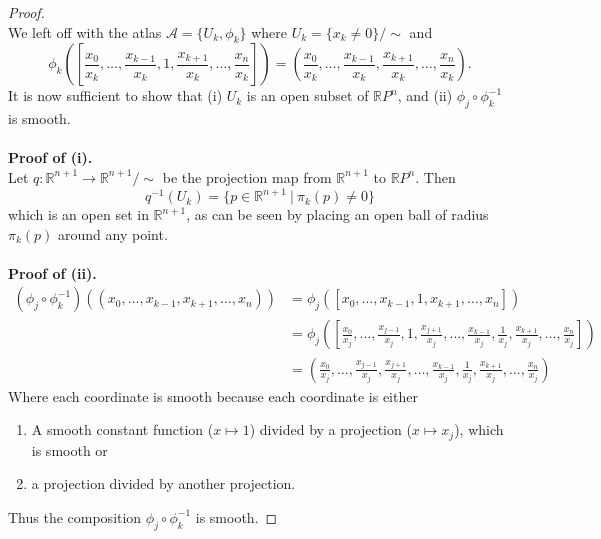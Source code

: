 \documentclass{article}
\begin{document}
\begin{proof} \text{} \\
  We left off with the atlas $\mathcal{A} = \{U_k, \phi_k\}$
  where $U_k = \{x_k \not= 0\}/\sim$ and \[
    \phi_k\left(\left[
      \frac{x_0}{x_k}, \hdots,
      \frac{x_{k - 1}}{x_k}, 1, \frac{x_{k + 1}}{x_k}, \hdots,
      \frac{x_n}{x_k}
    \right]\right) = \left(
      \frac{x_0}{x_k}, \hdots,
      \frac{x_{k - 1}}{x_k}, \frac{x_{k + 1}}{x_k}, \hdots,
      \frac{x_n}{x_k}
    \right).
  \]
  It is now sufficient to show that (i) $U_k$ is an open subset of $\mathbb{R}P^n$,
  and (ii) $\phi_j \circ \phi_k^{-1}$ is smooth.\\
  \\
  \textbf{Proof of (i).}\\
  Let $q : \mathbb{R}^{n + 1} \rightarrow \mathbb{R}^{n + 1}/\sim$ be the
  projection map from $\mathbb{R}^{n + 1}$ to $\mathbb{R}P^n$. Then \[
    q^{-1}(U_k) = \{p \in \mathbb{R}^{n + 1}\ |\ \pi_k(p) \not= 0\}
  \] which is an open set in $\mathbb{R}^{n + 1}$, as can be seen by placing an
  open ball of radius $\pi_k(p)$ around any point.\\
  \\
  \textbf{Proof of (ii).}\begin{align*}
    (\phi_j \circ \phi_k^{-1})((x_0, \hdots, x_{k - 1}, x_{k + 1}, \hdots, x_n))
    &= \phi_j([x_0, \hdots, x_{k - 1}, 1, x_{k + 1}, \hdots, x_n]) \\
    &= \phi_j\left(\left[
      \frac{x_0}{x_j}, \hdots,
      \frac{x_{j - 1}}{x_j}, 1, \frac{x_{j + 1}}{x_j}, \hdots,
      \frac{x_{k - 1}}{x_j}, \frac{1}{x_j}, \frac{x_{k + 1}}{x_j}, \hdots,
      \frac{x_n}{x_j}
    \right]\right) \\
    &= \left(
      \frac{x_0}{x_j}, \hdots,
      \frac{x_{j - 1}}{x_j}, \frac{x_{j + 1}}{x_j}, \hdots,
      \frac{x_{k - 1}}{x_j}, \frac{1}{x_j}, \frac{x_{k + 1}}{x_j}, \hdots,
      \frac{x_n}{x_j}
    \right)
  \end{align*}
  Where each coordinate is smooth because each coordinate is either \begin{enumerate}
    \item A smooth constant function ($x \mapsto 1$) divided by a projection
    ($x \mapsto x_j$), which is smooth or
    \item a projection divided by another projection.
  \end{enumerate}
  Thus the composition $\phi_j \circ \phi_k^{-1}$ is smooth.
  \end{proof}
\end{document}
